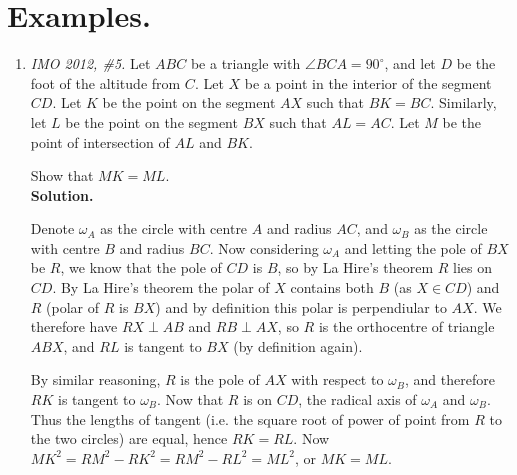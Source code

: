 \documentclass[11pt,a4paper]{article}
\begin{document}
\section {Examples.}
\begin{enumerate}
\item\emph {IMO 2012, \#5.} Let $ABC$ be a triangle with $\angle BCA=90^{\circ}$, and let $D$ be the foot of the altitude from $C$. Let $X$ be a point in the interior of the segment $CD$. Let $K$ be the point on the segment $AX$ such that $BK=BC$. Similarly, let $L$ be the point on the segment $BX$ such that $AL=AC$. Let $M$ be the point of intersection of $AL$ and $BK$.

Show that $MK=ML$.\\
\textbf{Solution.}

 Denote $\omega_A$ as the circle with centre $A$ and radius $AC$, and $\omega_B$ as the circle with centre $B$ and radius $BC$. Now considering $\omega_A$ and letting the pole of $BX$ be $R$, we know that the pole of $CD$ is $B$, so by La Hire's theorem $R$ lies on $CD$. By La Hire's theorem the polar of $X$ contains both $B$ (as $X\in CD$) and $R$ (polar of $R$ is $BX$) and by definition this polar is perpendiular to $AX$. We therefore have $RX\perp AB$ and $RB\perp AX$, so $R$ is the orthocentre of triangle $ABX$, and $RL$ is tangent to $BX$ (by definition again).

By similar reasoning, $R$ is the pole of $AX$ with respect to $\omega_B$, and therefore $RK$ is tangent to $\omega_B$. Now that $R$ is on $CD$, the radical axis of $\omega_A$ and $\omega_B$. Thus the lengths of tangent (i.e. the square root of power of point from $R$ to the two circles) are equal, hence $RK=RL$. Now $MK^2=RM^2-RK^2=RM^2-RL^2=ML^2$, or $MK=ML$.


\end{enumerate}
\end{document}
